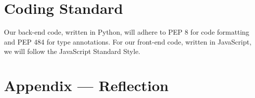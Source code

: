 \documentclass{article}
\begin{document}



\section{Coding Standard}
Our back-end code, written in Python, will adhere to PEP 8 for code formatting and PEP 484 for type annotations. 
For our front-end code, written in JavaScript, we will follow the JavaScript Standard Style.

\newpage{}

\section*{Appendix --- Reflection}


% 
\end{document}
